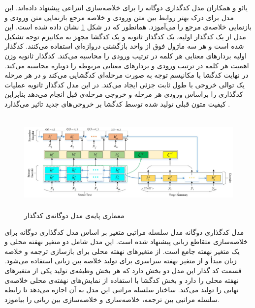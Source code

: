 یائو
و همکاران مدل کدگذاری دوگانه را برای خلاصه‌سازی انتزاعی پیشنهاد داده‌اند. این مدل برای درک بهتر روابط بین متن ورودی و خلاصه مرجع بازنمایی متن ورودی و بازنمایی خلاصه‌ی مرجع را می‌آموزد. همانطور که در شکل \ref{fig:dual_encoder} نشان داده شده است.
این مدل از یک کدگذار اولیه، یک کدگذار ثانویه و یک کدگشا مجهز به مکانیزم توجه تشکیل شده است و هر سه ماژول فوق از واحد بازگشتی دروازه‌ای
استفاده می‌کنند. 
کدگذار اولیه بردارهای معنایی هر کلمه در ترتیب ورودی را محاسبه می‌کند. کدگذار ثانویه وزن اهمیت هر کلمه در ترتیب ورودی و بردارهای معنایی مربوطه را دوباره محاسبه می‌کند. در نهایت کدگشا با مکانیسم توجه به صورت مرحله‌ای کدگشایی می‌کند و در هر مرحله یک توالی خروجی با طول ثابت جزئی ایجاد می‌کند. در این مدل کدگذار ثانویه عملیات کدگذاری را براساس ورودی هر مرحله و خروجی مرحله‌ی قبل انجام می‌دهد بنابراین کیفیت متون قبلی تولید شده توسط کدگشا بر خروجی‌های جدید تاثیر می‌گذارد
\cite{yao2018dual}.



\begin{figure}[!h]
	\begin{center}
		\includegraphics[height=5cm]{dualـencoder.png}
	\end{center}
	\caption{معماری پایه‌‌ی مدل دوگانه‌ی کدگذار 	\cite{yao2018dual}}
	\label{fig:dual_encoder}
	\medskip
	\small
\end{figure}


مدل کدگذاری دوگانه مدل سلسله مراتبی متغیر بر اساس مدل کدگذاری دوگانه برای خلاصه‌سازی متقاطع زبانی
پیشنهاد شده است. این مدل شامل دو متغیر نهفته محلی و یک متغیر نهفته جامع است. از متغیرهای نهفته محلی برای بازسازی ترجمه و خلاصه زبان مبدأ و از متغیر نهفته سراسری برای تولید خلاصه بین زبانی استفاده می‌شود. قسمت کد گذار این مدل دو بخش دارد که هر بخش وظیفه‌ی تولید یکی از متغیرهای نهفته محلی را دارد و بخش کدگشا با استفاده از نمایش‌های نهفته‌ی محلی خلاصه‌ی نهایی را تولید می‌کند.
ساختار سلسله مراتبی این مدل به آن اجازه می‌دهد تا رابطه سلسله مراتبی بین ترجمه، خلاصه‌سازی و خلاصه‌سازی بین زبانی را بیاموزد\cite{variational}.

